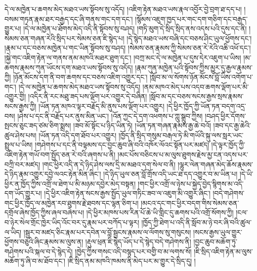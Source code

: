 དེ་ལ་མཁྱེན་པ་ཆགས་མེད་མཐའ་ཡས་སྟོབས་སུ་འདོད། །འཇིག་རྟེན་མཐའ་ཡས་རྣལ་འབྱོར་བྱེ་བྲག་ཐ་དད་པ། །བསམ་གཏན་རྣམ་ཐར་བརྒྱད་དང་ཞི་གནས་གང་དག་དང་། །སྙོམས་འཇུག་ཁྱད་པར་གང་དག་གཅིག་དང་བརྒྱད་གྱུར་པ། །དེ་ལ་མཁྱེན་པ་ཐོགས་མེད་འདི་ནི་སྟོབས་སུ་བཤད། །གཏི་མུག་དེ་སྲིད་སྲིད་ནས་འདས་པའི་དུས་དང་ནི། །སེམས་ཅན་གཞན་རེའི་སྲིད་པར་སེམས་ཅན་ཇི་སྙེད་པ། །དེ་སྙེད་མཐའ་ཡས་བཞི་དང་བཅས་ཤིང་ཡུལ་ཕྱོགས་དང་། །རྣམ་པ་དང་བཅས་མཁྱེན་པ་གང་ཡིན་སྟོབས་སུ་བཤད། །སེམས་ཅན་རྣམས་ཀྱི་སེམས་ཅན་རེ་རེའི་འཆི་འཕོ་དང་། །སྐྱེ་གང་འཇིག་རྟེན་ལ་གནས་ནམ་མཁའི་མཐར་ཐུག་དང་། །བཀྲ་མང་དེ་ལ་མཁྱེན་པ་དུས་དེར་འཇུག་པ་ཡིས། །མ་ཆགས་རྣམས་ཀུན་ཡོངས་དག་མཐའ་ཡས་སྟོབས་སུ་འདོད། །རྣམ་ཀུན་མཁྱེན་པའི་སྟོབས་ཀྱིས་མྱུར་དུ་རྒྱལ་རྣམས་ཀྱི། །ཉོན་མོངས་དག་ནི་བག་ཆགས་དང་བཅས་འཇིག་འགྱུར་དང་། །སློབ་མ་ལ་སོགས་ཉོན་མོངས་བློ་ཡིས་འགོག་པ་གང་། །དེ་ལ་མཁྱེན་པ་ཆགས་མེད་མཐའ་ཡས་སྟོབས་སུ་འདོད། །ནམ་མཁའ་མེད་པས་འདབ་ཆགས་ལྡོག་པར་མི་འགྱུར་གྱི། །འདིར་ནི་རང་མཐུ་ཟད་པས་ལྡོག་པར་འགྱུར་དེ་བཞིན། །སློབ་མ་དང་བཅས་སངས་རྒྱས་སྲས་རྣམས་སངས་རྒྱས་ཀྱི། །ཡོན་ཏན་མཁའ་ལྟར་བརྗོད་མི་ནུས་པས་ལྡོག་པར་འགྱུར། །དེ་ཕྱིར་ཁྱོད་ཀྱི་ཡོན་ཏན་བདག་འདྲ་བས། །ཤེས་པ་དང་ནི་བརྗོད་པར་ནུས་མིན་ཡང་། །འོན་ཀྱང་དེ་དག་འཕགས་པ་ཀླུ་སྒྲུབ་ཀྱིས། །བཤད་ཕྱིར་དོགས་སྤངས་ཅུང་ཟད་ཙམ་ཅིག་སྨྲས། །ཟབ་མོ་སྟོང་པ་ཉིད་ཡིན་ཏེ། །ཡོན་ཏན་གཞན་རྣམས་རྒྱ་ཆེ་བའོ། །ཟབ་དང་རྒྱ་ཆེའི་ཚུལ་ཤེས་པས། །ཡོན་ཏན་འདི་དག་ཐོབ་པར་འགྱུར། །ཁྱོད་ནི་སྲིད་གསུམ་བརྒལ་ཏེ་མི་གཡོའི་སྐུ་ལས་སླར་ཡང་སྤྲུལ་པ་ཡིས། །གཤེགས་པ་དང་ནི་བལྟམས་དང་བྱང་ཆུབ་ཞི་བའི་འཁོར་ལོའང་སྟོན་པར་མཛད། །དེ་ལྟར་ཁྱོད་ཀྱི་འཇིག་རྟེན་གཡོ་བག་སྤྱོད་ཅན་རེ་བའི་ཞགས་པ་ནི། །མང་པོས་བཅིངས་པ་མ་ལུས་ཐུགས་རྗེས་མྱ་ངན་འདས་པར་བཀྲི་བར་མཛད། །གང་ཕྱིར་འདི་ན་དེ་ཉིད་ཤེས་ལས་དྲི་མ་མཐའ་དག་སེལ་བ་ནི། །ལྷུར་ལེན་གཞན་མེད་ཆོས་རྣམས་དེ་ཉིད་རྣམ་འགྱུར་དབྱེ་ལའང་རྟེན་མིན་ཞིང་། །དེ་ཉིད་ཡུལ་ཅན་བློ་གྲོས་འདི་ཡང་ཐ་དད་འགྱུར་བ་མ་ཡིན་པ། །དེ་ཡི་ཕྱིར་ན་ཁྱོད་ཀྱིས་འགྲོ་ལ་ཐེག་པ་མི་མཉམ་དབྱེར་མེད་བསྟན། །གང་ཕྱིར་འགྲོ་ལ་ཉེས་པ་སྐྱེད་བྱེད་སྙིགས་མ་འདི་དག་ཡོད་གྱུར་པ། །དེ་ཕྱིར་འཇིག་རྟེན་སངས་རྒྱས་སྤྱོད་ཡུལ་གཏིང་ཟབ་ལ་འཇུག་མི་འགྱུར་ཞིང་། །བདེ་གཤེགས་གང་ཕྱིར་ཁྱོད་ལ་མཁྱེན་རབ་ཐུགས་རྗེ་ཐབས་དང་ལྷན་ཅིག་པ། །མངའ་དང་གང་ཕྱིར་བདག་གིས་སེམས་ཅན་དགྲོལ་ཞེས་ཁྱོད་ཀྱིས་ཞལ་བཞེས་པ། །དེ་ཕྱིར་མཁས་པས་རིན་པོ་ཆེ་ཡི་གླིང་དུ་ཆགས་པའི་འགྲོ་སོགས་ཀྱི། །ངལ་བ་ཉེར་སེལ་གྲོང་ཁྱེར་ཡིད་འོང་བར་དུ་རྣམ་པར་བཀོད་པ་ལྟར། །ཁྱོད་ཀྱི་ཐེག་པ་འདི་ནི་སློབ་མ་ཉེ་བར་ཞི་བའི་ཚུལ་ལ་ཡིད། །སྦྱར་བ་མཛད་ཅིང་རྣམ་པར་དབེན་ལ་བློ་སྦྱངས་རྣམས་ལ་ལོགས་སུ་གསུངས། །སངས་རྒྱས་ཡུལ་གྱུར་ཕྱོགས་བཅུའི་ཞིང་རྣམས་མ་ལུས་ན། །རྡུལ་ཕྲན་ཇི་སྙེད་ཡོད་པ་དེ་སྙེད་བདེ་གཤེགས་ནི། །བྱང་ཆུབ་མཆོག་ཏུ་གཤེགས་པའི་སྐལ་བ་དེ་སྙེད་དེ། །ཁྱེད་ཀྱིས་གསང་འདི་བསྙད་པར་བགྱི་བ་མ་ལགས་སོ། །ཇི་སྲིད་འཇིག་རྟེན་མ་ལུས་མཆོག་ཏུ་ཞི་བ་མ་ཐོབ་དང་། །ཇི་སྲིད་ནམ་མཁའི་ཁམས་ནི་མེད་པར་མ་གྱུར་དེ་སྲིད་དུ། །
